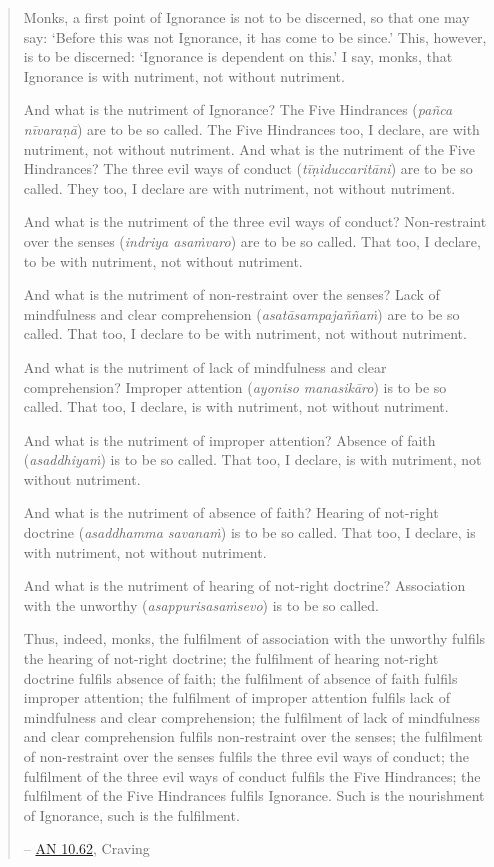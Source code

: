 \begin{quote}
Monks, a first point of Ignorance is not to be discerned, so that one may say: `Before this was not Ignorance, it has come to be since.' This, however, is to be discerned: `Ignorance is dependent on this.' I say, monks, that Ignorance is with nutriment, not without nutriment.

And what is the nutriment of Ignorance? The Five Hindrances (\emph{pañca nīvaraṇā}) are to be so called. The Five Hindrances too, I declare, are with nutriment, not without nutriment. And what is the nutriment of the Five Hindrances? The three evil ways of conduct (\emph{tīṇiduccaritāni}) are to be so called. They too, I declare are with nutriment, not without nutriment.

And what is the nutriment of the three evil ways of conduct? Non-restraint over the senses (\emph{indriya asaṁvaro}) are to be so called. That too, I declare, to be with nutriment, not without nutriment.

And what is the nutriment of non-restraint over the senses? Lack of mindfulness and clear comprehension (\emph{asatāsampajaññaṁ}) are to be so called. That too, I declare to be with nutriment, not without nutriment.

And what is the nutriment of lack of mindfulness and clear comprehension? Improper attention (\emph{ayoniso manasikāro}) is to be so called. That too, I declare, is with nutriment, not without nutriment.

And what is the nutriment of improper attention? Absence of faith (\emph{asaddhiyaṁ}) is to be so called. That too, I declare, is with nutriment, not without nutriment.

And what is the nutriment of absence of faith? Hearing of not-right doctrine (\emph{asaddhamma savanaṁ}) is to be so called. That too, I declare, is with nutriment, not without nutriment.

And what is the nutriment of hearing of not-right doctrine? Association with the unworthy (\emph{asappurisasaṁsevo}) is to be so called.

Thus, indeed, monks, the fulfilment of association with the unworthy fulfils the hearing of not-right doctrine; the fulfilment of hearing not-right doctrine fulfils absence of faith; the fulfilment of absence of faith fulfils improper attention; the fulfilment of improper attention fulfils lack of mindfulness and clear comprehension; the fulfilment of lack of mindfulness and clear comprehension fulfils non-restraint over the senses; the fulfilment of non-restraint over the senses fulfils the three evil ways of conduct; the fulfilment of the three evil ways of conduct fulfils the Five Hindrances; the fulfilment of the Five Hindrances fulfils Ignorance. Such is the nourishment of Ignorance, such is the fulfilment.

 -- \href{https://suttacentral.net/an10.62/en/bodhi}{AN 10.62}, Craving
\end{quote}

